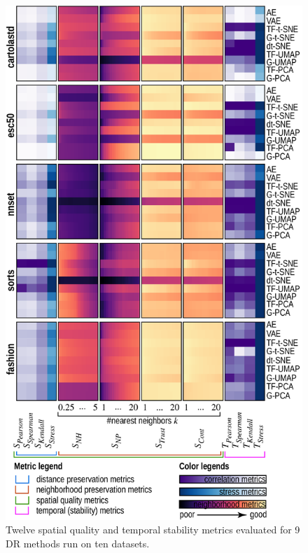 \begin{figure}[h]\centering
  \vspace{-0.2cm}
  \includegraphics[width=\linewidth]{figures/projection-evaluation/f2-a.png}
  \caption{Twelve spatial quality and temporal stability metrics evaluated for 9 DR  methods run on ten datasets.}
  \vspace{-0.2cm}
  \label{fig:all_datasets}
\end{figure}


